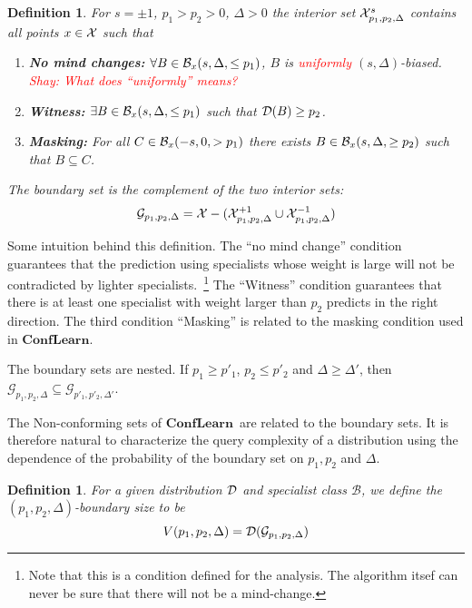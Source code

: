 \documentclass{article}
\newtheorem{definition}[theorem]{Definition}
\newcommand{\D}{{\cal D}}
\newcommand{\cB}{\mathcal{B}}
\newcommand{\cG}{\mathcal{G}}
\newcommand{\new}[1]{\textcolor{red}{#1}}
\newcommand{\ActiveLearn}{$\mathbf{ConfLearn}$}
\begin{document}
\newcommand{\interior}[3]{{#1}^{#2}_{#3}}
\newcommand{\boundry}[1]{\cG_{#1}}
\begin{definition}
For $s = \pm 1$, $p_1>p_2>0$, $\Delta>0$ the {\em interior set}
$\interior{\all}{s}{p_1,p_2,\Delta}$ contains all points $x \in {\cal X}$ such that
\begin{enumerate}
\item {\bf No mind changes:} $\forall B \in
  \restricted{\cB_x}{s,\Delta,\leq p_1}$, $B$ is \new{uniformly} $(s,\Delta)$-biased.
  \new{Shay: What does ``uniformly'' means?}
\item {\bf Witness:} $\exists B \in \restricted{\cB_x}{s,\Delta,\leq p_1}$ such that $\D(B) \geq p_2$.
\item {\bf Masking:} For all $C \in \restricted{\cB_x}{-s,0,> p_1}$
  there exists $B \in \restricted{\cB_x}{s,\Delta,\geq p_2}$ such
  that $B \subseteq C$.
\end{enumerate}
The {\em boundary set} is the complement of the two interior sets:
$$\boundry{p_1,p_2,\Delta} = \all -
(\interior{\all}{+1}{p_1,p_2,\Delta} \cup
\interior{\all}{-1}{p_1,p_2,\Delta}) $$
\end{definition}

Some intuition behind this definition. The ``no mind change''
condition guarantees that the prediction using specialists whose
weight is large will not be contradicted by lighter
specialists.~\footnote{Note that this is a condition defined for the
  analysis. The algorithm itsef can never be sure that there will not
  be a mind-change.} The ``Witness'' condition
guarantees that there is at least one specialist with weight
larger than $p_2$ predicts in the right direction. The third condition
``Masking'' is related to the masking condition used in \ActiveLearn.

The boundary sets are nested. If $p_1\geq p'_1$, $p_2 \leq p'_2$ and $\Delta \geq \Delta'$, then
$\boundry{p_1,p_2,\Delta} \subseteq
\boundry{p'_1,p'_2,\Delta'}$.

The Non-conforming sets of \ActiveLearn\ are related to the boundary
sets. It is therefore natural to characterize the query complexity of
a distribution using the dependence of the probability of the boundary
set on $p_1,p_2$ and $\Delta$.

\begin{definition}
  For a given distribution $\D$ and specialist class $\cB$, we define
  the $(p_1,p_2,\Delta)$-boundary size to be
  $$V(p_1,p_2,\Delta) =
  \D(\boundry{p_1,p_2,\Delta})$$
\end{definition}
\end{document}
